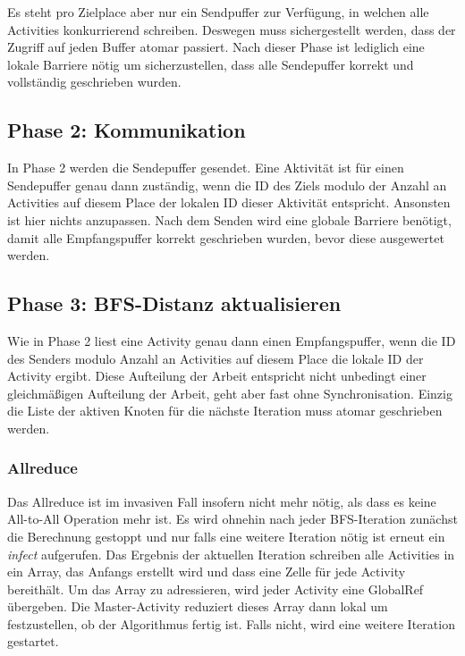 Es steht pro Zielplace aber nur ein Sendpuffer zur Verfügung, in welchen alle Activities konkurrierend schreiben. Deswegen muss sichergestellt werden, dass der Zugriff auf jeden Buffer atomar passiert. Nach dieser Phase ist lediglich eine lokale Barriere nötig um sicherzustellen, dass alle Sendepuffer korrekt und vollständig geschrieben wurden. 

\subsection{Phase 2: Kommunikation} %
\label{sub:parallel_phase_2_invasive}
In Phase 2 werden die Sendepuffer gesendet. Eine Aktivität ist für einen Sendepuffer genau dann zuständig, wenn die ID des Ziels modulo der Anzahl an Activities auf diesem Place der lokalen ID dieser Aktivität entspricht. Ansonsten ist hier nichts anzupassen. Nach dem Senden wird eine globale Barriere benötigt, damit alle Empfangspuffer korrekt geschrieben wurden, bevor diese ausgewertet werden.

\subsection{Phase 3: BFS-Distanz aktualisieren} %
\label{sub:phase_3_invasive}
Wie in Phase 2 liest eine Activity genau dann einen Empfangspuffer, wenn die ID des Senders modulo Anzahl an Activities auf diesem Place die lokale ID der Activity ergibt. Diese Aufteilung der Arbeit entspricht nicht unbedingt einer gleichmäßigen Aufteilung der Arbeit, geht aber fast ohne Synchronisation. Einzig die Liste der aktiven Knoten für die nächste Iteration muss atomar geschrieben werden.

\subsubsection{Allreduce} %
\label{ssub:allreduce_invasive}
Das Allreduce ist im invasiven Fall insofern nicht mehr nötig, als dass es keine All-to-All Operation mehr ist. Es wird ohnehin nach jeder BFS-Iteration zunächst die Berechnung gestoppt und nur falls eine weitere Iteration nötig ist erneut ein \textit{infect} aufgerufen. Das Ergebnis der aktuellen Iteration schreiben alle Activities in ein Array, das Anfangs erstellt wird und dass eine Zelle für jede Activity bereithält. Um das Array zu adressieren, wird jeder Activity eine GlobalRef übergeben. Die Master-Activity reduziert dieses Array dann lokal um festzustellen, ob der Algorithmus fertig ist. Falls nicht, wird eine weitere Iteration gestartet.


